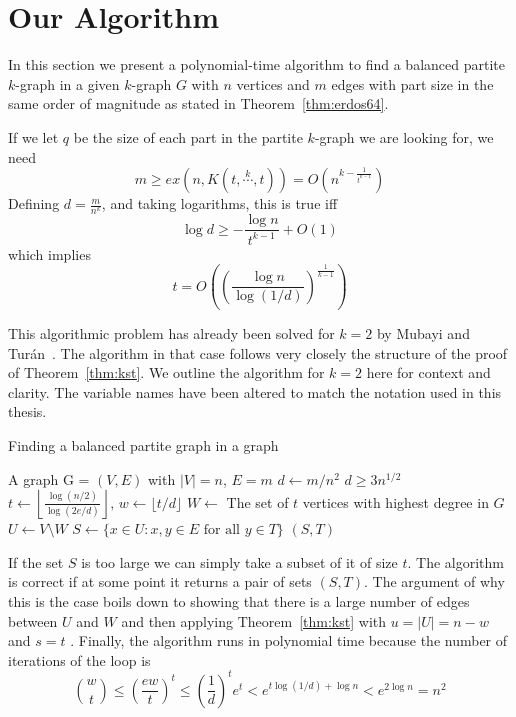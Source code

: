 \section{Our Algorithm}\label{sec:algorithm}

In this section we present a polynomial-time algorithm to find a balanced partite $k$-graph in a given $k$-graph $G$
with $n$ vertices and $m$ edges with part size in the same order of magnitude as stated in
Theorem~\ref{thm:erdos64}.

\begin{remark}
    If we let $q$ be the size of each part in the partite $k$-graph we are looking for, we need
    \[
        m \geq ex(n, K(t, \overset{k}{\cdots}, t)) = O\left(n^{k - \frac{1}{t^{k-1}}}\right)
    \]
    Defining $d = \frac{m}{n^k}$, and taking logarithms, this is true iff
    \[
        \log d \geq - \frac{\log n}{t^{k-1}} + O(1)
    \]
    which implies
    \[
        t = O\left(\left(\frac{\log n}{\log (1/d)}\right)^{\frac{1}{k-1}}\right)
    \]
\end{remark}

This algorithmic problem has already been solved for $k = 2$ by Mubayi and Turán~\cite{MUBAYI2010174}.
The algorithm in that case follows very closely the structure of the proof of Theorem~\ref{thm:kst}.
We outline the algorithm for $k = 2$ here for context and clarity.
The variable names have been altered to match the notation used in this thesis.

\begin{algorithm}
    \caption{Finding a balanced partite graph in a graph}
    \label{alg:bipartite}
        \begin{algorithmic}[1]
        \Require A graph G = $(V, E)$ with $|V| = n$, $E = m$
        \State $d \gets m / n^2 $
        \Ensure $d \geq 3 n^{1/2}$
        \State $t \gets \left\lfloor\frac{\log (n/2) }{\log (2e/d)}\right\rfloor,\, w \gets \lfloor t/d \rfloor$
        \State $W \gets $ The set of $t$ vertices with highest degree in $G$
        \State $U \gets V \setminus W$
            \State $S \gets \{x \in U : {x, y} \in E \text{ for all } y \in T\}$
                \State \Return $(S, T)$
            \EndIf
        \EndFor
        \end{algorithmic}
\end{algorithm}

If the set $S$ is too large we can simply take a subset of it of size $t$.
The algorithm is correct if at some point it returns a pair of sets $(S, T)$.
The argument of why this is the case boils down to showing that there is a
large number of edges between $U$ and $W$ and then applying Theorem~\ref{thm:kst}
with $u = |U| = n - w$ and $s = t$ .
Finally, the algorithm runs in polynomial time because 
the  number of iterations of the loop is
\[
    \binom{w}{t} \leq \left(\frac{ew}{t}\right)^t \leq \left(\frac{1}{d}\right)^t e^t < e^{t \log (1/d) + \log n} < e^{2\log n} = n^2
\]

